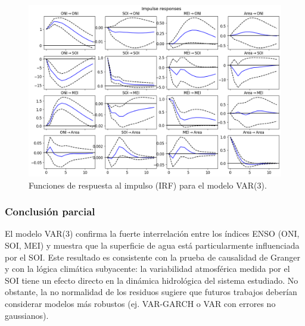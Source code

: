 \begin{figure}[H]
    \centering
    \includegraphics[scale=0.45]{Figures/var_ir.png}
    \caption{Funciones de respuesta al impulso (IRF) para el modelo VAR(3).}
    \label{fig:var_irf}
\end{figure}

\subsubsection{Conclusión parcial}
El modelo VAR(3) confirma la fuerte interrelación entre los índices ENSO (ONI, SOI, MEI) y muestra que la superficie de agua está particularmente influenciada por el SOI. Este resultado es consistente con la prueba de causalidad de Granger y con la lógica climática subyacente: la variabilidad atmosférica medida por el SOI tiene un efecto directo en la dinámica hidrológica del sistema estudiado. No obstante, la no normalidad de los residuos sugiere que futuros trabajos deberían considerar modelos más robustos (ej. VAR-GARCH o VAR con errores no gaussianos).


